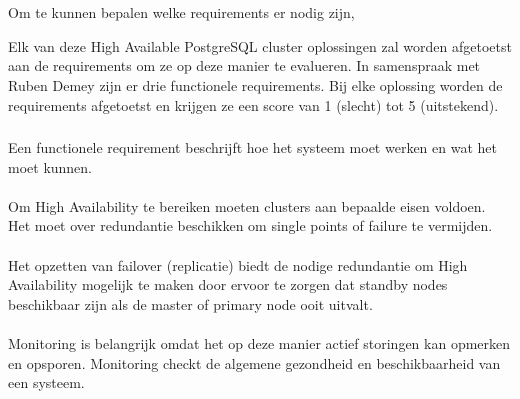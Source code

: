 
\chapter{}
\label{ch:schifting}


\section{}
\label{sec:Requirements}
Om te kunnen bepalen welke requirements er nodig zijn,

Elk van deze High Available PostgreSQL cluster oplossingen zal worden afgetoetst aan de requirements om ze op deze manier te evalueren. In samenspraak met Ruben Demey zijn er drie functionele requirements. Bij elke oplossing worden de requirements afgetoetst en krijgen ze een score van 1 (slecht) tot 5 (uitstekend).


\subsection{}
\label{subsec:Functionele Requirements}
Een functionele requirement beschrijft hoe het systeem moet werken en wat het moet kunnen.

\subsubsection{}
\label{subsubsec:Redundancy}
Om High Availability te bereiken moeten clusters aan bepaalde eisen voldoen. Het moet over redundantie beschikken om single points of failure te vermijden. 


\subsubsection{}
\label{subsubsec:Failover}
Het opzetten van failover (replicatie) biedt de nodige redundantie om High Availability mogelijk te maken door ervoor te zorgen dat standby nodes beschikbaar zijn als de master of primary node ooit uitvalt. 

\subsubsection{}
\label{subsubsec:Monitoring}
Monitoring is belangrijk omdat het op deze manier actief storingen kan opmerken en opsporen. Monitoring checkt de algemene gezondheid en beschikbaarheid van een systeem.


